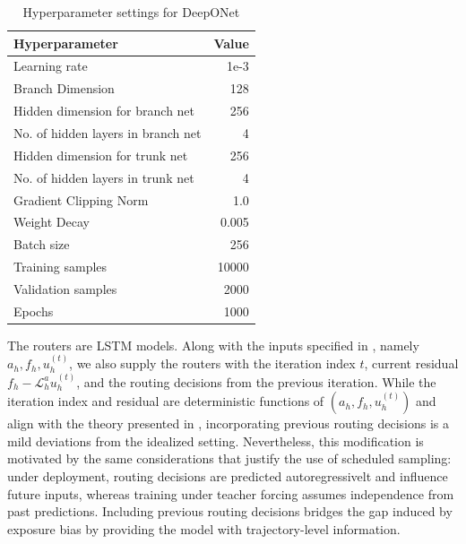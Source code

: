 \documentclass{article}
\begin{document}
\begin{table}[H]
    \centering
    \caption{Hyperparameter settings for DeepONet}
    \begin{tabular}{lr}
        \hline
        Hyperparameter & Value\\
        \hline \hline
        Learning rate & 1e-3 \\
        Branch Dimension & 128 \\
        Hidden dimension for branch net & 256 \\
        No. of hidden layers in branch net & 4\\
        Hidden dimension for trunk net & 256 \\
        No. of hidden layers in trunk net & 4\\
        Gradient Clipping Norm & 1.0  \\
        Weight Decay & 0.005 \\
        Batch size & 256 \\
        Training samples & 10000 \\
        Validation samples & 2000 \\
        Epochs & 1000 \\
        \hline
    \end{tabular}
    \label{tab:hpsettings}
\end{table}


The routers are LSTM models. Along with the inputs specified in , namely $a_h, f_h, u_h^{(t)}$, we also supply the routers with the iteration index $t$, current residual $f_h - \mathcal{L}_h^au_h^{(t)}$, and the routing decisions from the previous iteration. While the iteration index and residual are deterministic functions of $(a_h, f_h, u_h^{(t)})$ and align with the theory presented in , incorporating previous routing decisions is a mild deviations from the idealized setting. Nevertheless, this modification is motivated by the same considerations that justify the use of scheduled sampling: under deployment, routing decisions are predicted autoregressivelt and influence future inputs, whereas training under teacher forcing assumes independence from past predictions. Including previous routing decisions bridges the gap induced by exposure bias by providing the model with trajectory-level information. 
\end{document}
